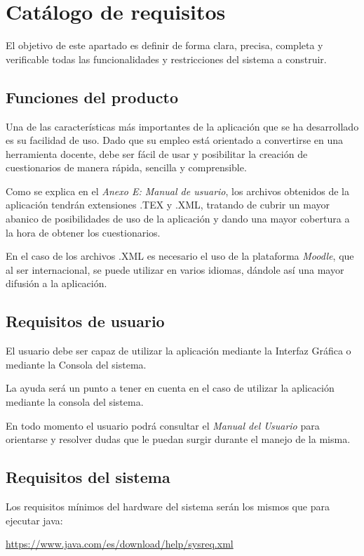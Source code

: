 \section{Catálogo de requisitos}
El objetivo de este apartado es definir de forma clara, precisa, completa y verificable todas las funcionalidades y restricciones del sistema a construir.

\subsection{Funciones del producto}
Una de las características más importantes de la aplicación que se ha  desarrollado es su facilidad de uso. 
Dado que su empleo está orientado a convertirse en una herramienta docente, debe ser fácil de usar y posibilitar la creación de cuestionarios de manera rápida, sencilla y comprensible.

Como se explica en el \textit{Anexo E: Manual de usuario}, los archivos obtenidos de la aplicación tendrán extensiones .TEX y .XML, tratando de cubrir un mayor abanico de posibilidades de uso de la aplicación y dando una mayor cobertura a la hora de obtener los cuestionarios.

En el caso de los archivos .XML es necesario el uso de la plataforma \textit{Moodle}, que al ser internacional, se puede utilizar en varios idiomas, dándole así una mayor difusión a la aplicación.

\subsection{Requisitos de usuario}
El usuario debe ser capaz de utilizar la aplicación mediante la Interfaz Gráfica o mediante la Consola del sistema. 

La ayuda será un punto a tener en cuenta en el caso de utilizar la aplicación mediante la consola del sistema.
 
En todo momento el usuario podrá consultar el \textit{Manual del Usuario} para
orientarse y resolver dudas que le puedan surgir durante el manejo de la misma.

\subsection{Requisitos del sistema}
Los requisitos mínimos del hardware del sistema serán los mismos que para ejecutar java:


\url{https://www.java.com/es/download/help/sysreq.xml}

